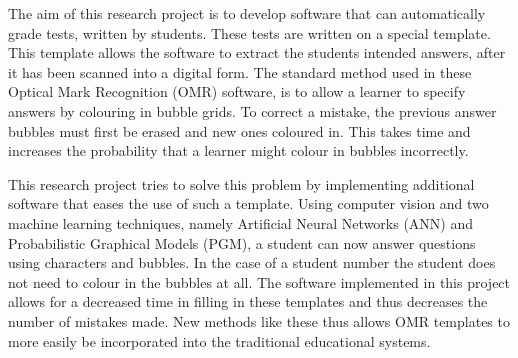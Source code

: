 


\begin{abstracts}        %
The aim of this research project is to develop software that can automatically grade tests, written by students. These tests are written on a special template. This template allows the software to extract the students intended answers, after it has been scanned into a digital form. The standard method used in these Optical Mark Recognition (OMR) software, is to allow a learner to specify answers by colouring in bubble grids. To correct a mistake, the previous answer bubbles must first be erased and new ones coloured in. This takes time and increases the probability that a learner might colour in bubbles incorrectly. 

This research project tries to solve this problem by implementing additional software that eases the use of such a template. Using computer vision and two machine learning techniques, namely Artificial Neural Networks (ANN) and Probabilistic Graphical Models (PGM), a student can now answer questions using characters and bubbles. In the case of a student number the student does not need to colour in the bubbles at all. The software implemented in this project allows for a decreased time in filling in these templates and thus decreases the number of mistakes made. New methods like these thus allows OMR templates to more easily be incorporated into the traditional educational systems.
\end{abstracts}

